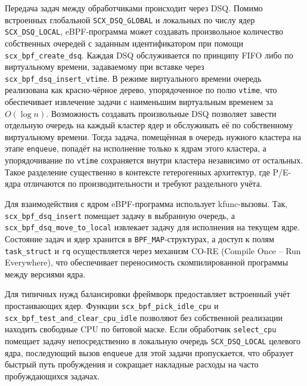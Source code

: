 \documentclass[14pt, oneside]{extbook}
\begin{document}
        Передача задач между обработчиками происходит через DSQ.
        Помимо встроенных глобальной \texttt{SCX\_DSQ\_GLOBAL}
        и локальных по числу ядер \texttt{SCX\_DSQ\_LOCAL},
        eBPF-программа может создавать произвольное количество собственных
        очередей с заданным идентификатором при помощи
        \texttt{scx\_bpf\_create\_dsq}.
        Каждая DSQ обслуживается по принципу FIFO либо по виртуальному времени,
        задаваемому при вставке через
        \texttt{scx\_bpf\_dsq\allowbreak\_insert\_vtime}.
        В режиме виртуального времени очередь реализована как
        красно-чёрное дерево, упорядоченное по полю \texttt{vtime},
        что обеспечивает извлечение задачи с наименьшим виртуальным
        временем за $O(\log n)$.
        Возможность создавать произвольные DSQ позволяет завести
        отдельную очередь на каждый кластер ядер и обслуживать её
        по собственному виртуальному времени. Тогда задача,
        помещённая в очередь нужного кластера на этапе \texttt{enqueue},
        попадёт на исполнение только к ядрам этого кластера, а
        упорядочивание по \texttt{vtime} сохраняется внутри кластера
        независимо от остальных. Такое разделение существенно
        в контексте гетерогенных архитектур, где P/E-ядра
        отличаются по производительности и требуют раздельного учёта.

        \begin{sloppypar}
                Для взаимодействия с ядром eBPF-программа использует
                kfunc-вызовы. Так, \texttt{scx\_bpf\_dsq\_insert}
                помещает задачу в выбранную очередь, а
                \texttt{scx\_bpf\_dsq\_move\_to\_local} извлекает
                задачу для исполнения на текущем ядре.
                Состояние задач и ядер хранится в \texttt{BPF\_MAP}-структурах,
                а доступ к полям \texttt{task\_struct} и \texttt{rq}
                осуществляется
                через механизм CO-RE (Compile Once -- Run
                Everywhere), что обеспечивает
                переносимость скомпилированной программы между версиями ядра.
        \end{sloppypar}

        Для типичных нужд балансировки фреймворк предоставляет
        встроенный учёт простаивающих ядер. Функции
        \texttt{scx\_bpf\_pick\_idle\_cpu} и
        \texttt{scx\_bpf\_test\_and\allowbreak\_clear\_cpu\_idle}
        позволяют без собственной реализации находить свободные
        CPU по битовой маске.
        Если обработчик \texttt{select\_cpu} помещает задачу
        непосредственно в локальную очередь \texttt{SCX\_DSQ\_LOCAL}
        целевого ядра, последующий вызов \texttt{enqueue} для этой
        задачи пропускается, что образует быстрый путь пробуждения
        и сокращает накладные расходы на часто пробуждающихся задачах.
\end{document}
